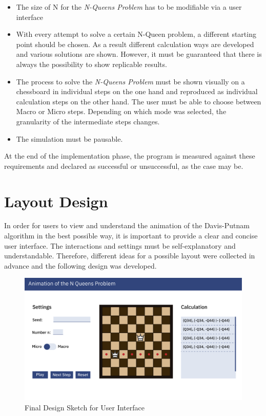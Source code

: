 \begin{itemize}
  \item The size of N for the \textit{N-Queens Problem} has to be modifiable via a user interface
  \item With every attempt to solve a certain N-Queen problem, a different starting point should be chosen. As a result different calculation ways are developed and various solutions are shown. However, it must be guaranteed that there is always the possibility to show replicable results. 
  \item The process to solve the \textit{N-Queens Problem} must be shown visually on a chessboard in individual steps on the one hand and reproduced as individual calculation steps on the other hand. The user must be able to choose between Macro or Micro steps. Depending on which mode was selected, the granularity of the intermediate steps changes.
  \item The simulation must be pausable.
\end{itemize}

At the end of the implementation phase, the program is measured against these requirements and declared as successful or unsuccessful, as the case may be. 

\section{Layout Design}
\label{sec:conDesign}
In order for users to view and understand the animation of the Davis-Putnam algorithm in the best possible way, it is important to provide a clear and concise user interface. The interactions and settings must be self-explanatory and understandable. Therefore, different ideas for a possible layout were collected in advance and the following design was developed. 

\begin{figure}[h]
  \centering
  \includegraphics[width=\textwidth]{img/Design_N_Queens}
  \caption{Final Design Sketch for User Interface}
  \label{fig:design}
\end{figure}

